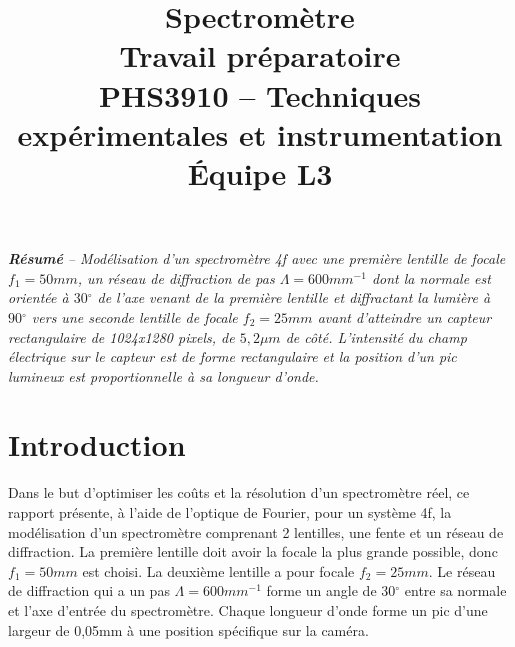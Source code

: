 \documentclass[conference]{IEEEtran}
\begin{document}
\title{Spectromètre\\
\large Travail préparatoire \\
PHS3910 -- Techniques expérimentales et instrumentation\\ 
Équipe L3}

\author{
\and
{}
\and
{}
\and
{}
}

\maketitle

\textit{\textbf{Résumé} -- Modélisation d'un spectromètre 4f avec une première lentille
de focale $f_1=50mm$, un réseau de diffraction de pas $\Lambda=600mm^{-1}$ dont la normale
est orientée à 
$30{^\circ}$ de l'axe venant de la première lentille et diffractant la lumière à 
$90{^\circ}$ vers une seconde lentille de focale $f_2=25mm$ avant d'atteindre un capteur
rectangulaire de 1024x1280 pixels, de $5,2\mu m$ de côté. L'intensité du champ électrique 
sur le capteur est de forme rectangulaire et la position d'un pic lumineux est 
proportionnelle à sa longueur d'onde.}

\section{Introduction}
Dans le but d'optimiser les coûts et la résolution d'un spectromètre réel,
ce rapport présente, à l'aide de l'optique de Fourier, pour un système 4f, la modélisation
d'un spectromètre comprenant 2 lentilles, une fente et un réseau de diffraction. 
La première lentille doit avoir la focale la plus grande possible, donc $f_1=50mm$
est choisi. La deuxième lentille a pour focale $f_2=25mm$. Le réseau de diffraction 
qui a un pas $\Lambda=600mm^{-1}$ forme un angle de $30{^\circ}$ entre sa normale et
l'axe d'entrée du spectromètre.
Chaque longueur d'onde forme un pic d'une largeur de 0,05mm à une position spécifique sur la caméra. \\
\end{document}
